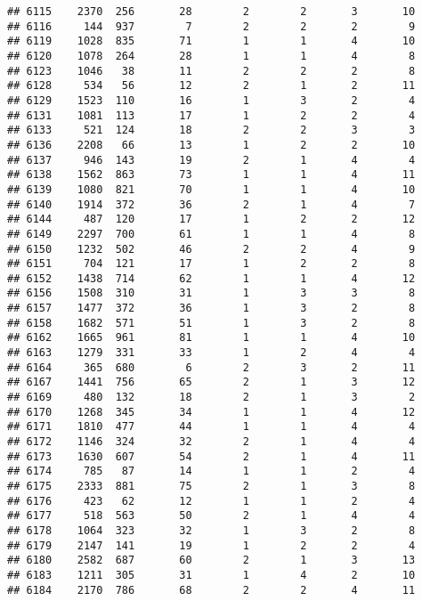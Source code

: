 \documentclass[]{article}
\begin{document}
\begin{verbatim}
## 6115    2370  256       28        2        2       3       10
## 6116     144  937        7        2        2       2        9
## 6119    1028  835       71        1        1       4       10
## 6120    1078  264       28        1        1       4        8
## 6123    1046   38       11        2        2       2        8
## 6128     534   56       12        2        1       2       11
## 6129    1523  110       16        1        3       2        4
## 6131    1081  113       17        1        2       2        4
## 6133     521  124       18        2        2       3        3
## 6136    2208   66       13        1        2       2       10
## 6137     946  143       19        2        1       4        4
## 6138    1562  863       73        1        1       4       11
## 6139    1080  821       70        1        1       4       10
## 6140    1914  372       36        2        1       4        7
## 6144     487  120       17        1        2       2       12
## 6149    2297  700       61        1        1       4        8
## 6150    1232  502       46        2        2       4        9
## 6151     704  121       17        1        2       2        8
## 6152    1438  714       62        1        1       4       12
## 6156    1508  310       31        1        3       3        8
## 6157    1477  372       36        1        3       2        8
## 6158    1682  571       51        1        3       2        8
## 6162    1665  961       81        1        1       4       10
## 6163    1279  331       33        1        2       4        4
## 6164     365  680        6        2        3       2       11
## 6167    1441  756       65        2        1       3       12
## 6169     480  132       18        2        1       3        2
## 6170    1268  345       34        1        1       4       12
## 6171    1810  477       44        1        1       4        4
## 6172    1146  324       32        2        1       4        4
## 6173    1630  607       54        2        1       4       11
## 6174     785   87       14        1        1       2        4
## 6175    2333  881       75        2        1       3        8
## 6176     423   62       12        1        1       2        4
## 6177     518  563       50        2        1       4        4
## 6178    1064  323       32        1        3       2        8
## 6179    2147  141       19        1        2       2        4
## 6180    2582  687       60        2        1       3       13
## 6183    1211  305       31        1        4       2       10
## 6184    2170  786       68        2        2       4       11

\end{verbatim}
\end{document}
